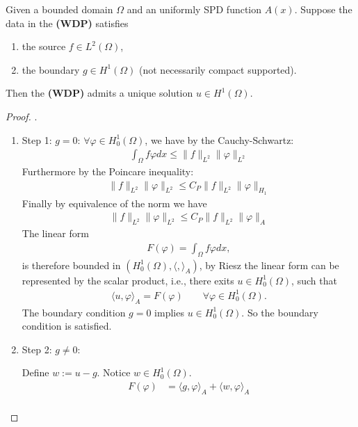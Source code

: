 \begin{theorem}
	 Given a bounded domain $\Omega$ and an uniformly SPD function $A(x)$. Suppose the data in the \textbf{(WDP)} satisfies 
	 \begin{enumerate}
	 	\item the source $f \in L^2(\Omega)$,
	 	\item the boundary $g \in H^1(\Omega)$ (not necessarily compact supported). 
	 \end{enumerate}
	  Then the \textbf{(WDP)}  admits a unique solution $u \in H^1(\Omega)$.
\end{theorem}
\begin{proof}.
\begin{enumerate}
	\item Step 1: $g = 0$: $\forall \varphi \in H^1_0(\Omega)$, we have by the Cauchy-Schwartz:
		\begin{align*}
		 	\int_\Omega f\varphi dx \leq \|f\|_{L^2} \|\varphi\|_{L^2} 
		 \end{align*}
		 Furthermore by the Poincare inequality:
		 \begin{align*}
		 	\|f\|_{L^2} \|\varphi\|_{L^2} \leq C_P \|f\|_{L^2} \|\varphi\|_{H_1}
		\end{align*}
		Finally by equivalence of the norm we have
		\begin{align*}
			\|f\|_{L^2} \|\varphi\|_{L^2} \leq C_P \|f\|_{L^2} \|\varphi\|_{A}
		\end{align*}
		The linear form 
		\begin{align*}
			F(\varphi) = \int_\Omega f \varphi dx,
		\end{align*}
		is therefore bounded in $(H^1_0(\Omega), \langle,\rangle_A)$, by Riesz the linear form can be represented by the scalar product, i.e., there exits $u \in H_0^1(\Omega)$, such that
		\begin{align*} 
		\langle u, \varphi \rangle_A = F(\varphi) \qquad \forall \varphi \in H^1_0(\Omega).	
		\end{align*}
		The boundary condition $g = 0$ implies $u \in H^1_0(\Omega)$. So the boundary condition is satisfied.
	\item Step 2: $g \neq 0$: \par 
	Define $w := u - g$. Notice $w \in H^1_0(\Omega)$. 
	\begin{align*}
		F(\varphi) &= \langle g,  \varphi \rangle_A + \langle w, \varphi \rangle_A
	\end{align*}
	\begin{align*}

\end{align*}
\end{enumerate}
\end{proof}
